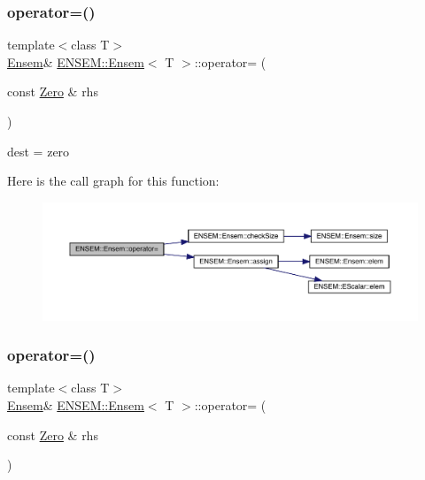 \subsubsection{\texorpdfstring{operator=()}{operator=()}\hspace{0.1cm}{\footnotesize\ttfamily [3/10]}}
{\footnotesize\ttfamily template$<$class T$>$ \\
\mbox{\hyperlink{classENSEM_1_1Ensem}{Ensem}}\& \mbox{\hyperlink{classENSEM_1_1Ensem}{E\+N\+S\+E\+M\+::\+Ensem}}$<$ T $>$\+::operator= (\begin{DoxyParamCaption}\item[{const \mbox{\hyperlink{structENSEM_1_1Zero}{Zero}} \&}]{rhs }\end{DoxyParamCaption})\hspace{0.3cm}{\ttfamily [inline]}}



dest = zero 

Here is the call graph for this function\+:
\nopagebreak
\begin{figure}[H]
\begin{center}
\leavevmode
\includegraphics[width=350pt]{d7/d3e/classENSEM_1_1Ensem_a55913bc59bca1022f5189cbc86632c11_cgraph}
\end{center}
\end{figure}
\mbox{\label{classENSEM_1_1Ensem_a55913bc59bca1022f5189cbc86632c11}} 
\subsubsection{\texorpdfstring{operator=()}{operator=()}\hspace{0.1cm}{\footnotesize\ttfamily [4/10]}}
{\footnotesize\ttfamily template$<$class T$>$ \\
\mbox{\hyperlink{classENSEM_1_1Ensem}{Ensem}}\& \mbox{\hyperlink{classENSEM_1_1Ensem}{E\+N\+S\+E\+M\+::\+Ensem}}$<$ T $>$\+::operator= (\begin{DoxyParamCaption}\item[{const \mbox{\hyperlink{structENSEM_1_1Zero}{Zero}} \&}]{rhs }\end{DoxyParamCaption})\hspace{0.3cm}{\ttfamily [inline]}}



